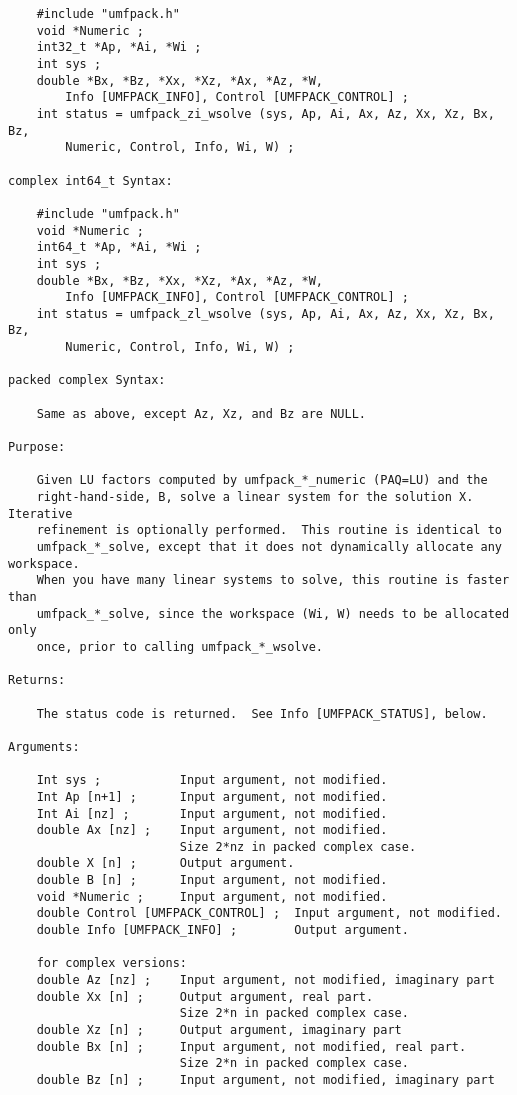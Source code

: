 \documentclass[11pt]{article}
\begin{document}
{\begin{verbatim}
    #include "umfpack.h"
    void *Numeric ;
    int32_t *Ap, *Ai, *Wi ; 
    int sys ;
    double *Bx, *Bz, *Xx, *Xz, *Ax, *Az, *W,
        Info [UMFPACK_INFO], Control [UMFPACK_CONTROL] ;
    int status = umfpack_zi_wsolve (sys, Ap, Ai, Ax, Az, Xx, Xz, Bx, Bz,
        Numeric, Control, Info, Wi, W) ;

complex int64_t Syntax:

    #include "umfpack.h"
    void *Numeric ;
    int64_t *Ap, *Ai, *Wi ;
    int sys ;
    double *Bx, *Bz, *Xx, *Xz, *Ax, *Az, *W,
        Info [UMFPACK_INFO], Control [UMFPACK_CONTROL] ;
    int status = umfpack_zl_wsolve (sys, Ap, Ai, Ax, Az, Xx, Xz, Bx, Bz,
        Numeric, Control, Info, Wi, W) ;

packed complex Syntax:

    Same as above, except Az, Xz, and Bz are NULL.

Purpose:

    Given LU factors computed by umfpack_*_numeric (PAQ=LU) and the
    right-hand-side, B, solve a linear system for the solution X.  Iterative
    refinement is optionally performed.  This routine is identical to
    umfpack_*_solve, except that it does not dynamically allocate any workspace.
    When you have many linear systems to solve, this routine is faster than
    umfpack_*_solve, since the workspace (Wi, W) needs to be allocated only
    once, prior to calling umfpack_*_wsolve.

Returns:

    The status code is returned.  See Info [UMFPACK_STATUS], below.

Arguments:

    Int sys ;           Input argument, not modified.
    Int Ap [n+1] ;      Input argument, not modified.
    Int Ai [nz] ;       Input argument, not modified.
    double Ax [nz] ;    Input argument, not modified.
                        Size 2*nz in packed complex case.
    double X [n] ;      Output argument.
    double B [n] ;      Input argument, not modified.
    void *Numeric ;     Input argument, not modified.
    double Control [UMFPACK_CONTROL] ;  Input argument, not modified.
    double Info [UMFPACK_INFO] ;        Output argument.

    for complex versions:
    double Az [nz] ;    Input argument, not modified, imaginary part
    double Xx [n] ;     Output argument, real part.
                        Size 2*n in packed complex case.
    double Xz [n] ;     Output argument, imaginary part
    double Bx [n] ;     Input argument, not modified, real part.
                        Size 2*n in packed complex case.
    double Bz [n] ;     Input argument, not modified, imaginary part


\end{verbatim}}
\end{document}

